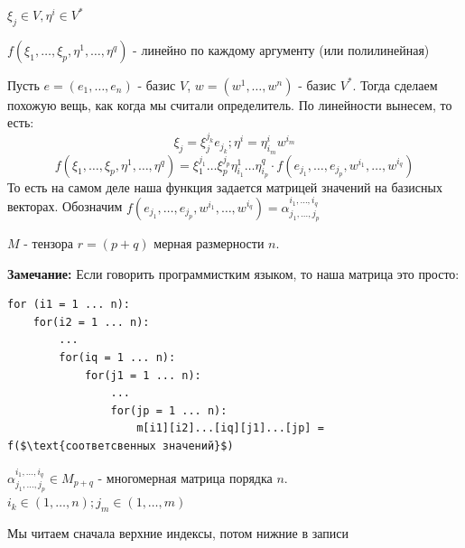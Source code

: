 $\xi_j \in V, \eta^i \in V^*$

$f(\xi_1,\ldots,\xi_p,\eta^1,\ldots, \eta^q)$ - линейно по каждому аргументу (или полилинейная)

Пусть $e = (e_1,\ldots, e_n)$ - базис $V$, $w = (w^1,\ldots, w^n)$ - базис $V^*$. Тогда сделаем похожую вещь, как когда мы считали определитель. По линейности вынесем, то есть:
$$\xi_j = \xi_j^{j_k}e_{j_k};\eta^i = \eta_{i_m}^iw^{i_m}$$
$$f(\xi_1,\ldots,\xi_p,\eta^1,\ldots, \eta^q) = \xi_1^{j_1}\ldots\xi_p^{j_p}\eta_{i_1}^1 \ldots \eta^q_{i_p} \cdot f(e_{j_1},\ldots, e_{j_p},w^{i_1},\ldots, w^{i_q})$$
То есть  на самом деле наша функция задается матрицей значений на базисных векторах. Обозначим $f(e_{j_1},\ldots, e_{j_p},w^{i_1},\ldots, w^{i_q}) = \alpha_{j_1,\ldots,j_p}^{i_1,\ldots,i_q}$

 $M$ -  тензора $r = (p+q)$ мерная размерности $n$. 

\textbf{Замечание:} Если говорить программистким языком, то наша матрица это просто:

\begin{lstlisting}[mathescape]
for (i1 = 1 ... n):
    for(i2 = 1 ... n):
        ...
        for(iq = 1 ... n):
            for(j1 = 1 ... n):
                ...
                for(jp = 1 ... n):
                    m[i1][i2]...[iq][j1]...[jp] = f($\text{соответсвенных значений}$)
\end{lstlisting}


$\alpha^{i_1,\ldots,i_q}_{j_1,\ldots, j_p} \in M_{p+q}$ - многомерная матрица порядка $n$. $i_k \in (1,\ldots,n); j_m \in (1,\ldots, m)$

Мы читаем сначала верхние индексы, потом нижние в записи

